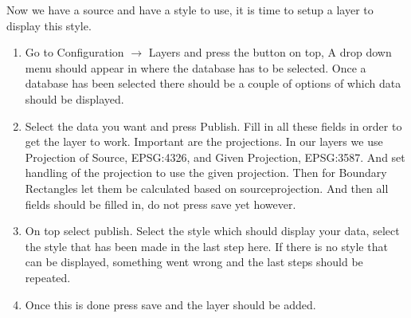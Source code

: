 Now we have a source and have a style to use, it is time to setup a layer to display this style. 
\begin{enumerate}
	\item Go to Configuration $\rightarrow$ Layers and press the button on top, A drop down menu should appear in where the database has to be selected.  Once a database has been selected there should be a couple of options of which data should be displayed.
	\item Select the data you want and press Publish. Fill in all these fields in order to get the layer to work. Important are the projections. In our layers we use Projection of Source, EPSG:4326, and Given Projection, EPSG:3587. And set handling of the projection to use the given projection. Then for Boundary Rectangles let them be calculated based on sourceprojection. And then all fields should be filled in, do not press save yet however. 
	\item On top select publish. Select the style which should display your data, select the style that has been made in the last step here. If there is no style that can be displayed, something went wrong and the last steps should be repeated.
	\item Once this is done press save and the layer should be added.
\end{enumerate}


